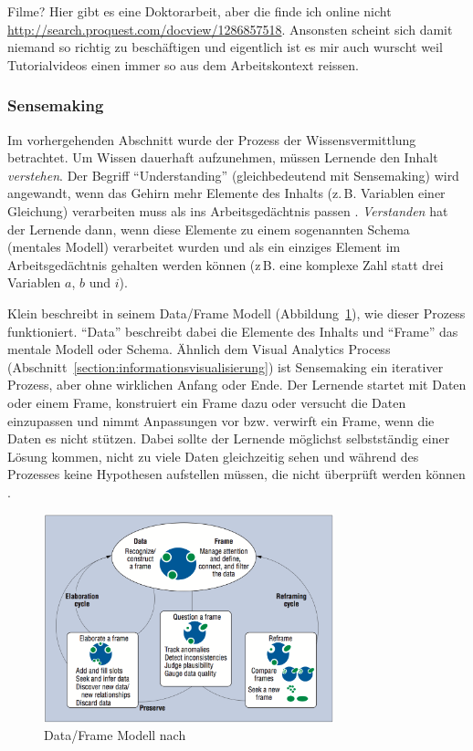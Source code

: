 \documentclass[
	headsepline,
	footsepline,
	fontsize=12pt,
	bibliography=totoc
]{scrbook}
\begin{document}
Filme? Hier gibt es eine Doktorarbeit, aber die finde ich online nicht \url{http://search.proquest.com/docview/1286857518}. Ansonsten scheint sich damit niemand so richtig zu beschäftigen und eigentlich ist es mir auch wurscht weil Tutorialvideos einen immer so aus dem Arbeitskontext reissen.


\subsubsection{Sensemaking}
\label{section:sensemaking}

Im vorhergehenden Abschnitt wurde der Prozess der Wissensvermittlung betrachtet. Um Wissen dauerhaft aufzunehmen, müssen Lernende den Inhalt \emph{verstehen}. Der Begriff \enquote{Understanding} (gleichbedeutend mit Sensemaking) wird angewandt, wenn das Gehirn mehr Elemente des Inhalts (z.\,B. Variablen einer Gleichung) verarbeiten muss als ins Arbeitsgedächtnis passen \cite{Sweller1998}. \emph{Verstanden} hat der Lernende dann, wenn diese Elemente zu einem sogenannten Schema (mentales Modell) verarbeitet wurden und als ein einziges Element im Arbeitsgedächtnis gehalten werden können (z\,B. eine komplexe Zahl statt drei Variablen $a$, $b$ und $i$).


Klein \cite{Klein2006a} beschreibt in seinem Data/Frame Modell (Abbildung~\ref{figure:data_frame_model}), wie dieser Prozess funktioniert. \enquote{Data} beschreibt dabei die Elemente des Inhalts und \enquote{Frame} das mentale Modell oder Schema. Ähnlich dem Visual Analytics Process (Abschnitt~\ref{section:informationsvisualisierung}) ist Sensemaking ein iterativer Prozess, aber ohne wirklichen Anfang oder Ende. Der Lernende startet mit Daten oder einem Frame, konstruiert ein Frame dazu oder versucht die Daten einzupassen und nimmt Anpassungen vor bzw. verwirft ein Frame, wenn die Daten es nicht stützen. Dabei sollte der Lernende möglichst selbstständig einer Lösung kommen, nicht zu viele Daten gleichzeitig sehen und während des Prozesses keine Hypothesen aufstellen müssen, die nicht überprüft werden können \cite{Klein2006}.

\begin{figure}[htbp]
   \centering
   \includegraphics[width=0.75\textwidth]{images/grundlagen-data_frame_model.png}
   \caption{Data/Frame Modell nach \cite{Klein2006}}
   \label{figure:data_frame_model}
\end{figure}
\end{document}

